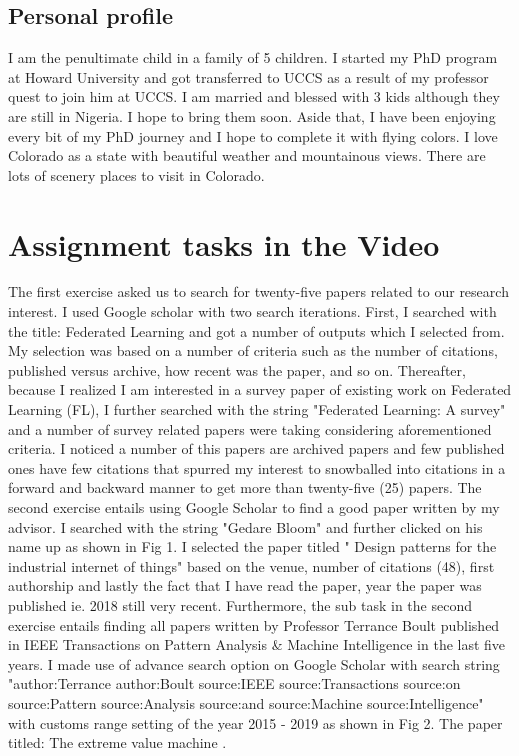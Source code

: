 \subsection{Personal profile}
I am the penultimate child in a family of 5 children. I started my PhD program at Howard University and got transferred to UCCS as a result of my professor quest to join him at UCCS. I am married and blessed with 3 kids although they are still  in Nigeria. I hope to bring them soon. Aside that, I have been enjoying every bit of my PhD journey and I hope to complete it with flying colors. I love Colorado as a state with beautiful weather and mountainous views. There are lots of scenery places to visit in Colorado.



\section{Assignment tasks in the Video}
The first exercise asked us to search for twenty-five papers related to our research interest. I used Google scholar with two search iterations. First, I searched with the title: Federated Learning and got a number of outputs which I selected from. My selection was based on a number of criteria such as the number of citations, published versus archive, how recent was the paper, and so on. Thereafter, because I realized I am interested in a survey paper of existing work on Federated Learning (FL), I further searched with the string "Federated Learning: A survey" and a number of survey related papers were taking considering aforementioned criteria. I noticed a number of this papers are archived papers and few published ones have few citations that spurred my interest to snowballed into citations in a forward and backward manner to get more than twenty-five (25) papers. 
The second exercise entails using Google Scholar to find a good paper written by my advisor. I searched with the string "Gedare Bloom" and further clicked on his name up as shown in Fig 1. I selected the paper titled " Design patterns for the industrial internet of things"  based on the venue, number of citations (48), first authorship and lastly the fact that I have read the paper, year the paper was published ie. 2018 still very recent\cite{b2}. 
Furthermore, the sub task in the second exercise entails finding all papers written by Professor Terrance Boult published in IEEE Transactions on Pattern Analysis & Machine Intelligence in the last five years. I made use of advance search option on Google Scholar with search string "author:Terrance author:Boult source:IEEE source:Transactions source:on source:Pattern source:Analysis source:and source:Machine source:Intelligence" with customs range setting of the year 2015 - 2019 as shown in Fig 2. The paper titled: The extreme value machine \cite{b1}.





